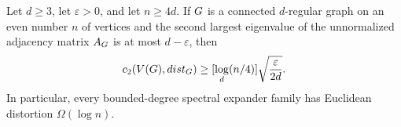 \begin{theorem}
	\label{thm:expanders-have-logarithmic-euclidean-distortion}
	Let \(d\geq 3\), let \(\varepsilon>0\), and let \(n\geq 4d\). If \(G\) is a connected \(d\)-regular graph on an even number \(n\) of vertices and the second largest eigenvalue of the unnormalized adjacency matrix \(A_{G}\) is at most \(d-\varepsilon\), then
	\begin{equation}
		\label{eq:expander-euclidean-distortion-lower-bound}
		c_2(\Vertices(\Graph),\operatorname{dist}_\Graph)\geq
		\left\lfloor \log_d(n/4)\right\rfloor
		\sqrt{\frac{\varepsilon}{2d}}.
	\end{equation}
	In particular, every bounded-degree spectral expander family has Euclidean distortion \(\Omega(\log n)\).
\end{theorem}

